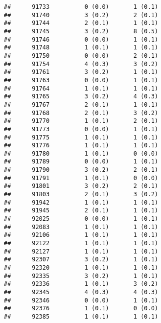 \documentclass[]{article}
\begin{document}
\begin{verbatim}
##      91733          0 (0.0)       1 (0.1)                       
##      91740          3 (0.2)       2 (0.1)                       
##      91744          2 (0.1)       1 (0.1)                       
##      91745          3 (0.2)       8 (0.5)                       
##      91746          0 (0.0)       1 (0.1)                       
##      91748          1 (0.1)       1 (0.1)                       
##      91750          0 (0.0)       2 (0.1)                       
##      91754          4 (0.3)       3 (0.2)                       
##      91761          3 (0.2)       1 (0.1)                       
##      91763          0 (0.0)       1 (0.1)                       
##      91764          1 (0.1)       1 (0.1)                       
##      91765          3 (0.2)       4 (0.3)                       
##      91767          2 (0.1)       1 (0.1)                       
##      91768          2 (0.1)       3 (0.2)                       
##      91770          1 (0.1)       2 (0.1)                       
##      91773          0 (0.0)       1 (0.1)                       
##      91775          1 (0.1)       1 (0.1)                       
##      91776          1 (0.1)       1 (0.1)                       
##      91780          1 (0.1)       0 (0.0)                       
##      91789          0 (0.0)       1 (0.1)                       
##      91790          3 (0.2)       2 (0.1)                       
##      91791          1 (0.1)       0 (0.0)                       
##      91801          3 (0.2)       2 (0.1)                       
##      91803          2 (0.1)       3 (0.2)                       
##      91942          1 (0.1)       1 (0.1)                       
##      91945          2 (0.1)       1 (0.1)                       
##      92025          0 (0.0)       1 (0.1)                       
##      92083          1 (0.1)       1 (0.1)                       
##      92106          1 (0.1)       1 (0.1)                       
##      92122          1 (0.1)       1 (0.1)                       
##      92127          1 (0.1)       1 (0.1)                       
##      92307          3 (0.2)       1 (0.1)                       
##      92320          1 (0.1)       1 (0.1)                       
##      92335          3 (0.2)       1 (0.1)                       
##      92336          1 (0.1)       3 (0.2)                       
##      92345          4 (0.3)       4 (0.3)                       
##      92346          0 (0.0)       1 (0.1)                       
##      92376          1 (0.1)       0 (0.0)                       
##      92385          1 (0.1)       1 (0.1)                       

\end{verbatim}
\end{document}
